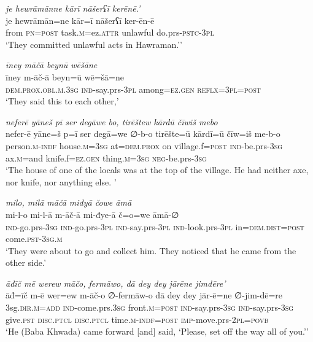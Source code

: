 \ea \label{BP.62}
\textit{je hewrāmānne kārī nāšerʕī kerēnē.’} \\ 
\gll je hewrāmān=ne kār=ī nāšerʕī ker-ēn-ē \\ 
 from \textsc{pn}\textsc{=\textsc{post}} task\textsc{.m}=ez.\textsc{attr} unlawful do.prs\textsc{-pstc}\textsc{-3pl} \\ 
\glt `They committed unlawful acts in Hawraman.’'
\z 
 
\ea \label{BP.66}
\textit{īney māčā beynū wēšāne} \\ 
\gll īney m-āč-ā beyn=ū wē=šā=ne \\ 
 \textsc{dem.prox}\textsc{.obl}\textsc{.m}\textsc{.3sg} \textsc{ind-}say.prs\textsc{-3pl} among\textsc{=ez.gen} \textsc{reflx}\textsc{=3pl}\textsc{=\textsc{post}} \\ 
\glt `They said this to each other,'
\z 
 
\ea \label{BP.71}
\textit{neferē yāneš pī ser degāwe bo, tirēštew kārdū čīwiš mebo} \\ 
\gll nefer-ē yāne=š p=ī ser degā=we ∅-b-o tirēšte=ū kārdī=ū čīw=iš me-b-o \\ 
 person\textsc{.m}\textsc{-indf} house\textsc{.m}\textsc{=3sg} at=\textsc{dem.prox} on village.f\textsc{=\textsc{post}} \textsc{ind-}be.prs\textsc{-3sg} ax\textsc{.m}=and knife.f\textsc{=ez.gen} thing\textsc{.m}\textsc{=3sg} \textsc{neg-}be.prs\textsc{-3sg} \\ 
\glt `The house of one of the locals was at the top of the village. He had neither axe, nor knife, nor anything else. '
\z 
 
\ea \label{BP.80}
\textit{milo, milā māčā miđyā čowe āmā} \\ 
\gll mi-l-o mi-l-ā m-āč-ā mi-đye-ā č=o=we āmā-∅ \\ 
 \textsc{ind-}go.prs\textsc{-3sg} \textsc{ind-}go.prs\textsc{-3pl} \textsc{ind-}say.prs\textsc{-3pl} \textsc{ind-}look.prs\textsc{-3pl} in=\textsc{dem.dist}\textsc{=\textsc{post}} come\textsc{.pst}\textsc{-3sg}\textsc{.m} \\ 
\glt `They were about to go and collect him. They noticed that he came from the other side.'
\z 
 
\ea \label{BP.86}
\textit{āđīč mē werew māčo, fermāwo, dā dey dey jārēne jimdēre’} \\ 
\gll āđ=īč m-ē wer=ew m-āč-o ∅-fermāw-o dā dey dey jār-ē=ne ∅-jim-dē=re \\ 
 3sg\textsc{.dir}\textsc{.m}\textsc{=add} \textsc{ind-}come.prs\textsc{.3sg} front\textsc{.m}\textsc{=\textsc{post}} \textsc{ind-}say.prs\textsc{-3sg} \textsc{ind-}say.prs\textsc{-3sg} give\textsc{.pst} \textsc{disc.ptcl} \textsc{disc.ptcl} time\textsc{.m}\textsc{-indf}\textsc{=\textsc{post}} \textsc{imp-}move.prs-\textsc{2pl}\textsc{=\textsc{povb}} \\ 
\glt `He (Baba Khwada) came forward [and] said, ‘Please, set off the way all of you.’'
\z 
 
